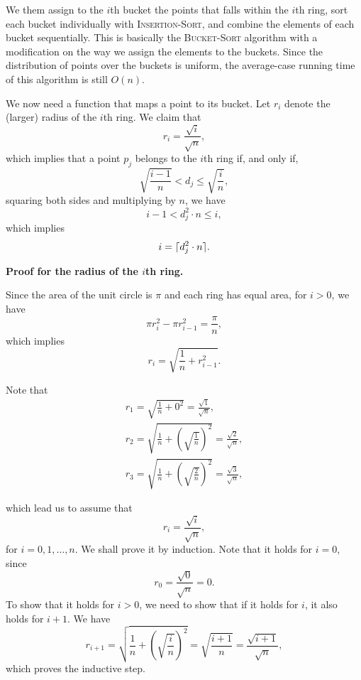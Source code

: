\begin{enumerate}
\begin{framed}
\begin{center}
\end{center}

We them assign to the $i$th bucket the points that falls within the $i$th ring,
sort each bucket individually with \textsc{Insertion-Sort}, and combine the
elements of each bucket sequentially. This is basically the \textsc{Bucket-Sort}
algorithm with a modification on the way we assign the elements to the buckets.
Since the distribution of points over the buckets is uniform, the average-case
running time of this algorithm is still $O(n)$.

We now need a function that maps a point to its bucket. Let $r_i$ denote the
(larger) radius of the $i$th ring. We claim that
\[
  r_i = \frac{\sqrt{i}}{\sqrt{n}},
\]
which implies that a point $p_j$ belongs to the $i$th ring if, and only if,
\[
  \sqrt{\frac{i - 1}{n}} < d_j \le \sqrt{\frac{i}{n}},
\]
squaring both sides and multiplying by $n$, we have
\[
  i - 1 < d_j^2 \cdot n \le i,
\]
which implies
\[
  i = \lceil d_j^2 \cdot n\rceil.
\]

\textbf{Proof for the radius of the $i$th ring.}

Since the area of the unit circle is $\pi$ and each ring has equal area, for
$i > 0$, we have
\[
  \pi r_i^2 - \pi r_{i - 1}^2 = \frac{\pi}{n},
\]
which implies
\[
  r_i = \sqrt{\frac{1}{n} + r^2_{i - 1}}.
\]

Note that
\begin{equation*}
\begin{aligned}
  r_1 = \sqrt{\frac{1}{n} + 0^2} = \frac{\sqrt{1}}{\sqrt{n}},\\
  r_2 = \sqrt{\frac{1}{n} + \left(\sqrt{\frac{1}{n}}\right)^2} = \frac{\sqrt{2}}{\sqrt{n}},\\
  r_3 = \sqrt{\frac{1}{n} + \left(\sqrt{\frac{2}{n}}\right)^2} = \frac{\sqrt{3}}{\sqrt{n}},
\end{aligned}
\end{equation*}

which lead us to assume that
\[
  r_i = \frac{\sqrt{i}}{\sqrt{n}},
\]
for $i = 0, 1, \dots, n$. We shall prove it by induction. Note that it holds for
$i = 0$, since
\[
  r_0 = \frac{\sqrt{0}}{\sqrt{n}} = 0.
\]
To show that it holds for $i > 0$, we need to show that if it holds for $i$, it
also holds for $i + 1$. We have
\[
  r_{i + 1} = \sqrt{\frac{1}{n} + \left(\sqrt{\frac{i}{n}}\right)^2}
            = \sqrt{\frac{i + 1}{n}}
            = \frac{\sqrt{i + 1}}{\sqrt{n}},
\]
which proves the inductive step.


\end{framed}
\end{enumerate}
